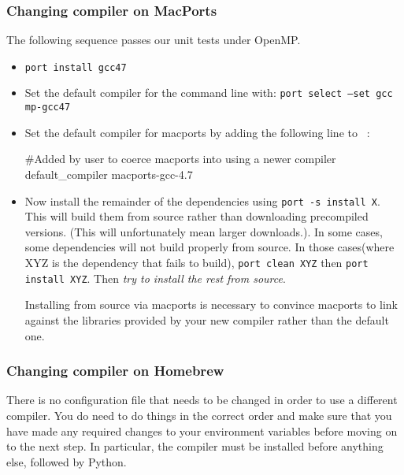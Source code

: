 \subsubsection*{Changing compiler on MacPorts}
The following sequence passes our unit tests under OpenMP.
\begin{itemize}
 \item \texttt{port install gcc47}
 \item Set the default compiler for the command line with: \texttt{port select --set gcc mp-gcc47}
 \item Set the default compiler for macports by adding the following line to \hfill~\linebreak[4] :
\begin{shellCode} 
#Added by user to coerce macports into using a newer compiler
default_compiler	macports-gcc-4.7 
\end{shellCode}
\item Now install the remainder of the dependencies using \texttt{port -s install X}.
This will build them from source rather than downloading precompiled versions.
(This will unfortunately mean larger downloads.).
In some cases, some dependencies will not build properly from source.
In those cases(where XYZ is the dependency that fails to build), \texttt{port clean XYZ} then \texttt{port install XYZ}.
Then \emph{try to install the rest from source}.

Installing from source via macports is necessary to convince macports to link against the libraries provided by 
your new compiler rather than the default one.
\end{itemize}




\subsubsection*{Changing compiler on Homebrew}
There is no configuration file that needs to be changed in order to use a different compiler.
You do need to do things in the correct order and make sure that you have made any required changes to 
your environment variables before moving on to the next step.
In particular, the compiler must be installed before anything else, followed by Python.
